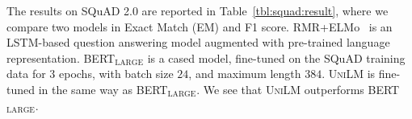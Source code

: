 \documentclass{article}
\newcommand\ours{\textsc{UniLM}}
\begin{document}
The results on SQuAD 2.0 are reported in Table~\ref{tbl:squad:result}, where we compare two models in Exact Match (EM) and F1 score. 
RMR+ELMo~\cite{hu-mrc-2018} is an LSTM-based question answering model augmented with pre-trained language representation.
BERT$_{\text{LARGE}}$ is a cased model, fine-tuned on the SQuAD training data for $3$ epochs, with batch size $24$, and maximum length $384$.
\ours{} is fine-tuned in the same way as BERT$_{\text{LARGE}}$.
We see that \ours{} outperforms BERT$_{\text{LARGE}}$.



\end{document}
